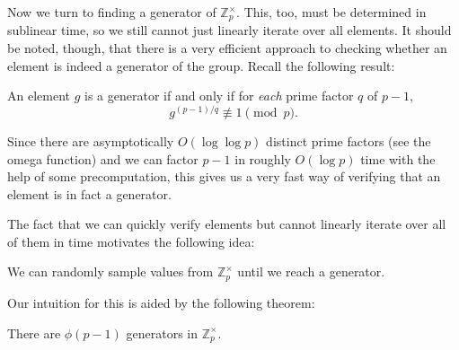 \documentclass[a4paper, 12pt]{article}
\begin{document}
\begin{solution}
    Now we turn to finding a generator of \( \mathbb{Z}_p^{\times} \). This, too, must be determined in sublinear time, so we still cannot just linearly iterate over all elements. It should be noted, though, that there is a very efficient approach to checking whether an element is indeed a generator of the group. Recall the following result:

    \begin{sidebox}
    \begin{fact}
        An element \( g \) is a generator if and only if for \textit{each} prime factor \( q \) of \( p - 1 \),
        \[
            g^{(p-1) / q} \not \equiv 1 \pmod{p}
        .\]
    \end{fact}
    \end{sidebox}

    Since there are asymptotically \( O(\log{\log p}) \) distinct prime factors (see the omega function) and we can factor \( p - 1 \) in roughly \( O(\log{p}) \) time with the help of some precomputation, this gives us a very fast way of verifying that an element is in fact a generator.

    The fact that we can quickly verify elements but cannot linearly iterate over all of them in time motivates the following idea:
    
    \begin{idea}
        We can randomly sample values from \( \mathbb{Z}_{p}^{\times} \) until we reach a generator.
    \end{idea}

    Our intuition for this is aided by the following theorem:

    \begin{sidebox}
    \begin{theorem}
        There are \( \phi(p - 1) \) generators in \( \mathbb{Z}_p^{\times} \).
    \end{theorem}
    \end{sidebox}


\end{solution}
\end{document}
